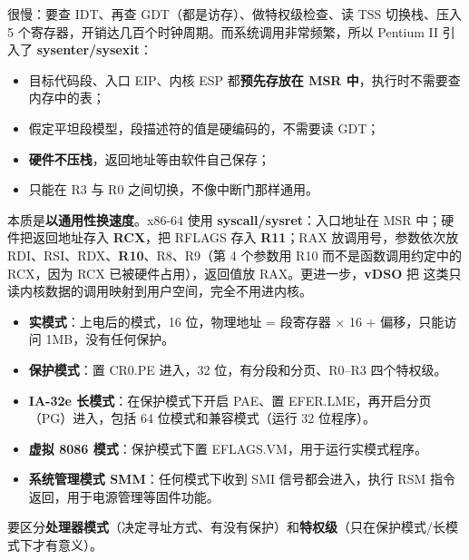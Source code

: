  很慢：要查 IDT、再查 GDT（都是访存）、做特权级检查、读 TSS 切换栈、压入 5 个寄存器，开销达几百个时钟周期。而系统调用非常频繁，所以 Pentium II 引入了 \textbf{sysenter/sysexit}：
\begin{itemize}
    \item 目标代码段、入口 EIP、内核 ESP 都\textbf{预先存放在 MSR 中}，执行时不需要查内存中的表；
    \item 假定平坦段模型，段描述符的值是硬编码的，不需要读 GDT；
    \item \textbf{硬件不压栈}，返回地址等由软件自己保存；
    \item 只能在 R3 与 R0 之间切换，不像中断门那样通用。
\end{itemize}
本质是\textbf{以通用性换速度}。x86-64 使用 \textbf{syscall/sysret}：入口地址在 MSR  中；硬件把返回地址存入 \textbf{RCX}，把 RFLAGS 存入 \textbf{R11}；RAX 放调用号，参数依次放 RDI、RSI、RDX、\textbf{R10}、R8、R9（第 4 个参数用 R10 而不是函数调用约定中的 RCX，因为 RCX 已被硬件占用），返回值放 RAX。更进一步，\textbf{vDSO} 把  这类只读内核数据的调用映射到用户空间，完全不用进内核。

\begin{itemize}
    \item \textbf{实模式}：上电后的模式，16 位，物理地址 = 段寄存器 $\times$ 16 + 偏移，只能访问 1MB，没有任何保护。
    \item \textbf{保护模式}：置 CR0.PE 进入，32 位，有分段和分页、R0–R3 四个特权级。
    \item \textbf{IA-32e 长模式}：在保护模式下开启 PAE、置 EFER.LME，再开启分页（PG）进入，包括 64 位模式和兼容模式（运行 32 位程序）。
    \item \textbf{虚拟 8086 模式}：保护模式下置 EFLAGS.VM，用于运行实模式程序。
    \item \textbf{系统管理模式 SMM}：任何模式下收到 SMI 信号都会进入，执行 RSM 指令返回，用于电源管理等固件功能。
\end{itemize}
要区分\textbf{处理器模式}（决定寻址方式、有没有保护）和\textbf{特权级}（只在保护模式/长模式下才有意义）。

